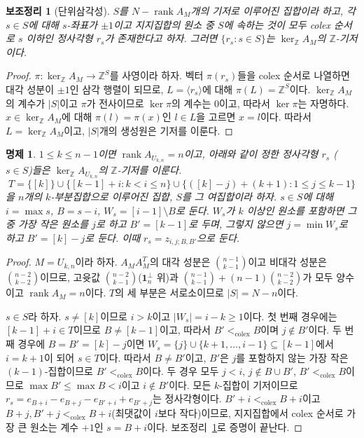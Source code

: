 \documentclass[11pt,a4paper]{article}
\theoremstyle{plain}
\newtheorem{lemma}[theorem]{보조정리}
\newtheorem{proposition}[theorem]{명제}
\theoremstyle{definition}
\newcommand{\Z}{\mathbb Z}
\newcommand{\AM}{A_M}
\newcommand{\kerZ}{\ker_{\Z}\!A_M}
\newcommand{\rank}{\operatorname{rank}}
\newcommand{\ind}{\mathbf 1}
\newcommand{\colex}{<_{\mathrm{colex}}}
\begin{document}
\begin{lemma}[단위삼각성]\label{lem:unitri}
$S$를 $N-\rank\AM$개의 기저로 이루어진 집합이라 하고, 각 $s\in S$에 대해 $s$\nobreakdash-좌표가 $\pm1$이고 지지집합의 원소 중 $S$에 속하는 것이 모두 colex 순서로 $s$ 이하인 정사각형 $r_s$가 존재한다고 하자. 그러면 $\{r_s:s\in S\}$는 $\kerZ$의 $\Z$\nobreakdash-기저이다.
\end{lemma}
\begin{proof}
$\pi:\kerZ\to\Z^S$를 사영이라 하자. 벡터 $\pi(r_s)$들을 colex 순서로 나열하면 대각 성분이 $\pm1$인 삼각 행렬이 되므로, $L=\langle r_s\rangle$에 대해 $\pi(L)=\Z^S$이다. $\kerZ$의 계수가 $|S|$이고 $\pi$가 전사이므로 $\ker\pi$의 계수는 $0$이고, 따라서 $\ker\pi$는 자명하다. $x\in\kerZ$에 대해 $\pi(l)=\pi(x)$인 $l\in L$을 고르면 $x=l$이다. 따라서 $L=\kerZ$이고, $|S|$개의 생성원은 기저를 이룬다.
\end{proof}

\begin{proposition}\label{prop:uniform}
$1\le k\le n-1$이면 $\rank A_{U_{k,n}}=n$이고, 아래와 같이 정한 정사각형 $r_s$ ($s\in S$)들은 $\ker_\Z A_{U_{k,n}}$의 $\Z$\nobreakdash-기저를 이룬다.
\[
T=\{[k]\}\cup\{[k-1]+i:k<i\le n\}\cup\{([k]-j)+(k+1):1\le j\le k-1\}
\]
을 $n$개의 $k$\nobreakdash-부분집합으로 이루어진 집합, $S$를 그 여집합이라 하자. $s\in S$에 대해 $i=\max s$, $B=s-i$, $W_s=[i-1]\setminus B$로 둔다. $W_s$가 $k$ 이상인 원소를 포함하면 그중 가장 작은 원소를 $j$로 하고 $B'=[k-1]$로 두며, 그렇지 않으면 $j=\min W_s$로 하고 $B'=[k]-j$로 둔다. 이때 $r_s=z_{i,j;B,B'}$으로 둔다.
\end{proposition}
\begin{proof}
$M=U_{k,n}$이라 하자. $\AM\AM^{T}$의 대각 성분은 $\binom{n-1}{k-1}$이고 비대각 성분은 $\binom{n-2}{k-2}$이므로, 고윳값 $\binom{n-2}{k-1}$($\ind_n^{\perp}$ 위)과 $\binom{n-1}{k-1}+(n-1)\binom{n-2}{k-2}$가 모두 양수이고 $\rank\AM=n$이다. $T$의 세 부분은 서로소이므로 $|S|=N-n$이다.

$s\in S$라 하자. $s\ne[k]$이므로 $i>k$이고 $|W_s|=i-k\ge1$이다. 첫 번째 경우에는 $[k-1]+i\in T$이므로 $B\ne[k-1]$이고, 따라서 $B'\colex B$이며 $j\notin B'$이다. 두 번째 경우에 $B=B'=[k]-j$이면 $W_s=\{j\}\cup\{k+1,\dots,i-1\}\subseteq[k-1]$에서 $i=k+1$이 되어 $s\in T$이다. 따라서 $B\ne B'$이고, $B'$은 $j$를 포함하지 않는 가장 작은 $(k-1)$\nobreakdash-집합이므로 $B'\colex B$이다. 두 경우 모두 $j<i$, $j\notin B\cup B'$, $B'\colex B$이므로 $\max B'\le\max B<i$이고 $i\notin B'$이다. 모든 $k$\nobreakdash-집합이 기저이므로 $r_s=e_{B+i}-e_{B+j}-e_{B'+i}+e_{B'+j}$는 정사각형이다. $B'+i\colex B+i$이고 $B+j,B'+j\colex B+i$(최댓값이 $i$보다 작다)이므로, 지지집합에서 colex 순서로 가장 큰 원소는 계수 $+1$인 $s=B+i$이다. 보조정리~\ref{lem:unitri}로 증명이 끝난다.
\end{proof}
\end{document}
